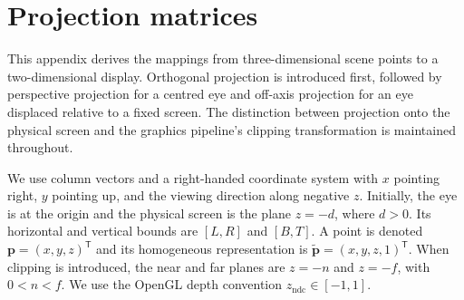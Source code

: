 \documentclass[11pt,a4paper]{article}
\newcommand{\vect}[1]{\boldsymbol{#1}}
\newcommand{\ndc}{\mathrm{ndc}}
\numberwithin{equation}{section}
\begin{document}
\appendix
\section{Projection matrices}
This appendix derives the mappings from three-dimensional scene points to a two-dimensional display. Orthogonal projection is introduced first, followed by perspective projection for a centred eye and off-axis projection for an eye displaced relative to a fixed screen. The distinction between projection onto the physical screen and the graphics pipeline's clipping transformation is maintained throughout.

We use column vectors and a right-handed coordinate system with $x$ pointing right, $y$ pointing up, and the viewing direction along negative $z$. Initially, the eye is at the origin and the physical screen is the plane $z=-d$, where $d>0$. Its horizontal and vertical bounds are $[L,R]$ and $[B,T]$. A point is denoted $\vect p=(x,y,z)^{\mathsf T}$ and its homogeneous representation is $\widetilde{\vect p}=(x,y,z,1)^{\mathsf T}$. When clipping is introduced, the near and far planes are $z=-n$ and $z=-f$, with $0<n<f$. We use the OpenGL depth convention $z_{\ndc}\in[-1,1]$.
\end{document}
